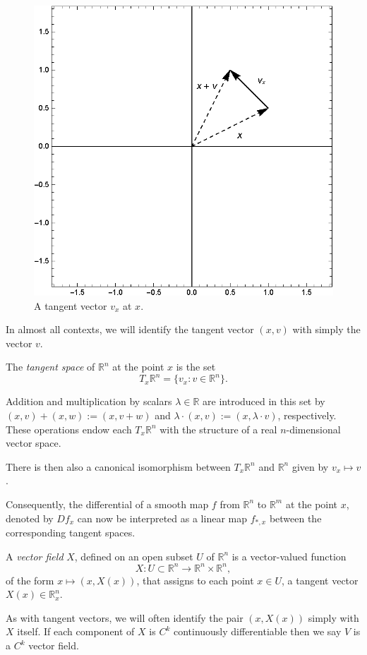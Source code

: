 \begin{figure}[h!]
\centering
\includegraphics[scale=0.55]{fig/chp2-fig0-c}
\caption{A tangent vector $v_x$ at $x$.}
\end{figure}

In almost all contexts, we will identify the tangent vector $(x,v)$ with simply the vector $v$.

\begin{definition}
The \textit{tangent space} of $\mathbb{R}^n$ at the point $x$ is the set
\[
T_x\mathbb{R}^n=\{v_x:v\in\mathbb{R}^n\}.
\]
\end{definition}
\noindent Addition and multiplication by scalars $\lambda\in\mathbb{R}$ are introduced in this set by $(x,v)+(x,w):=(x,v+w)$ and $\lambda\cdot(x,v):=(x,\lambda\cdot v)$, respectively. These operations endow each $T_x\mathbb{R}^n$ with the structure of a real $n$-dimensional vector space.

There is then also a canonical isomorphism between $T_x\mathbb{R}^n$ and $\mathbb{R}^n$ given by $v_x\mapsto v$.

Consequently, the differential of a smooth map $f$ from $\mathbb{R}^n$ to $\mathbb{R}^m$ at the point $x$, denoted by $Df_x$ can now be interpreted as a linear map $f_{*,x}$  between the corresponding tangent spaces.

\begin{definition}
A \textit{vector field} $X$, defined on an open subset $U$ of $\mathbb{R}^n$ is a vector-valued function
\[
X:U\subset\mathbb{R}^n\to\mathbb{R}^n\times\mathbb{R}^n,
\]
of the form $x\mapsto (x,X(x))$, that assigns to each point $x\in U$, a tangent vector $X(x)\in\mathbb{R}^n_x$.
\end{definition}
\noindent {}
\noindent As with tangent vectors, we will often identify the pair $(x,X(x))$ simply with $X$ itself.
If each component of $X$ is $C^k$ continuously differentiable then we say $V$ is a $C^k$ vector field. 


